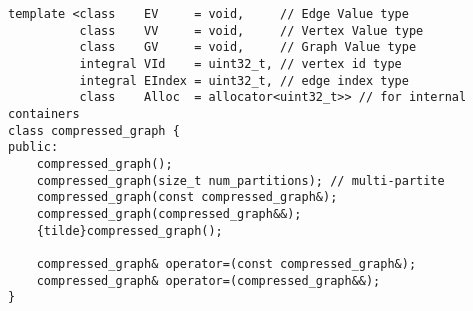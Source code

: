 \begin{lstlisting}
template <class    EV     = void,     // Edge Value type
          class    VV     = void,     // Vertex Value type
          class    GV     = void,     // Graph Value type
          integral VId    = uint32_t, // vertex id type
          integral EIndex = uint32_t, // edge index type
          class    Alloc  = allocator<uint32_t>> // for internal containers
class compressed_graph {
public:
    compressed_graph();
    compressed_graph(size_t num_partitions); // multi-partite
    compressed_graph(const compressed_graph&);
    compressed_graph(compressed_graph&&);
    {tilde}compressed_graph();

    compressed_graph& operator=(const compressed_graph&);
    compressed_graph& operator=(compressed_graph&&);
}
\end{lstlisting}



